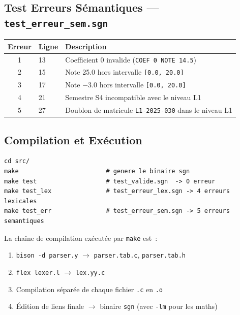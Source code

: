 \documentclass[a4paper,12pt]{article}
\begin{document}
\subsection{Test Erreurs Sémantiques — \texttt{test\_erreur\_sem.sgn}}

\begin{center}
\begin{tabular}{cll}
\toprule
\textbf{Erreur} & \textbf{Ligne} & \textbf{Description} \\
\midrule
1 & 13 & Coefficient 0 invalide (\texttt{COEF 0 NOTE 14.5}) \\
2 & 15 & Note 25.0 hors intervalle \texttt{[0.0, 20.0]} \\
3 & 17 & Note $-3.0$ hors intervalle \texttt{[0.0, 20.0]} \\
4 & 21 & Semestre S4 incompatible avec le niveau L1 \\
5 & 27 & Doublon de matricule \texttt{L1-2025-030} dans le niveau L1 \\
\bottomrule
\end{tabular}
\end{center}

\subsection{Compilation et Exécution}

\begin{lstlisting}[caption={Commandes de compilation et de test}, style=sgn, numbers=none, label=lst:make]
cd src/
make                        # genere le binaire sgn
make test                   # test_valide.sgn  -> 0 erreur
make test_lex               # test_erreur_lex.sgn -> 4 erreurs lexicales
make test_err               # test_erreur_sem.sgn -> 5 erreurs semantiques
\end{lstlisting}

La chaîne de compilation exécutée par \texttt{make} est~:
\begin{enumerate}[leftmargin=1.5em]
  \item \texttt{bison -d parser.y} $\rightarrow$ \texttt{parser.tab.c}, \texttt{parser.tab.h}
  \item \texttt{flex lexer.l} $\rightarrow$ \texttt{lex.yy.c}
  \item Compilation séparée de chaque fichier \texttt{.c} en \texttt{.o}
  \item Édition de liens finale $\rightarrow$ binaire \texttt{sgn} (avec \texttt{-lm} pour les maths)
\end{enumerate}
\end{document}
